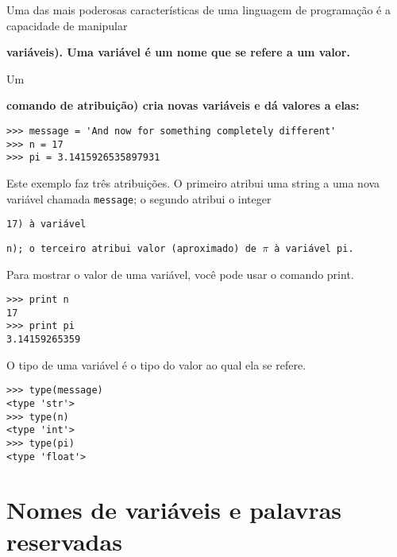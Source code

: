 Uma das mais poderosas características de uma linguagem de programação é a 
capacidade de manipular {\bf variáveis). Uma variável é um nome 
que se refere a um valor.

Um {\bf comando de atribuição) cria novas variáveis e dá 
valores a elas:

\beforeverb
\begin{verbatim}
>>> message = 'And now for something completely different'
>>> n = 17
>>> pi = 3.1415926535897931
\end{verbatim}
\afterverb
%

Este exemplo faz três atribuições. O primeiro atribui uma string 
a uma nova variável chamada {\tt message}; 
o segundo atribui o integer {\tt 17) à variável {\tt n); o terceiro 
atribui valor (aproximado) de $\pi$ à variável {\tt pi}.

Para mostrar o valor de uma variável, você pode usar o comando print.

\beforeverb
\begin{verbatim}
>>> print n
17
>>> print pi
3.14159265359
\end{verbatim}
\afterverb
%

O tipo de uma variável é o tipo do valor ao qual ela se refere.

\beforeverb
\begin{verbatim}
>>> type(message)
<type 'str'>
>>> type(n)
<type 'int'>
>>> type(pi)
<type 'float'>
\end{verbatim}
\afterverb
%

\section{Nomes de variáveis e palavras reservadas}

}}}}
